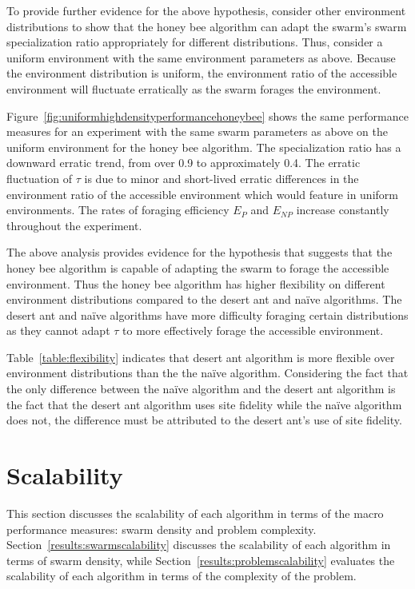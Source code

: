 To provide further evidence for the above hypothesis, consider other environment distributions to show that the honey bee algorithm can adapt the swarm's swarm specialization ratio appropriately for different distributions. Thus, consider a uniform environment with the same environment parameters as above. Because the environment distribution is uniform, the environment ratio of the accessible environment will fluctuate erratically as the swarm forages the environment.  

Figure~\ref{fig:uniformhighdensityperformancehoneybee} shows the same performance measures for an experiment with the same swarm parameters as above on the uniform environment for the honey bee algorithm. The specialization ratio has a downward erratic trend, from over 0.9 to approximately 0.4. The erratic fluctuation of $\tau$ is due to minor and short-lived erratic differences in the environment ratio of the accessible environment which would feature in uniform environments. The rates of foraging efficiency $E_P$ and $E_{NP}$  increase constantly throughout the experiment. 

The above analysis provides evidence for the hypothesis that suggests that the honey bee algorithm is capable of adapting the swarm to forage the accessible environment. Thus the honey bee algorithm has higher flexibility on different environment distributions compared to the desert ant and na\"ive algorithms. The desert ant and na\"ive algorithms have more difficulty foraging certain distributions as they cannot adapt $\tau$ to more effectively forage the accessible environment.

Table~\ref{table:flexibility} indicates that desert ant algorithm is more flexible over environment distributions than the the na\"ive algorithm. Considering the fact that the only difference between the na\"ive algorithm and the desert ant algorithm is the fact that the desert ant algorithm uses site fidelity while the na\"ive algorithm does not, the difference must be attributed to the desert ant's use of site fidelity. %

\section{Scalability}
\label{results:scalability}

This section discusses the scalability of each algorithm in terms of the macro performance measures: swarm density and problem complexity. Section~\ref{results:swarmscalability} discusses the scalability of each algorithm in terms of swarm density, while Section~\ref{results:problemscalability} evaluates the scalability of each algorithm in terms of the complexity of the problem.

